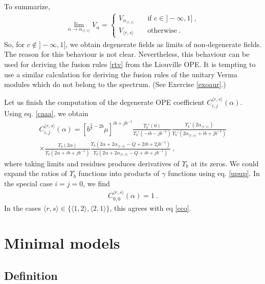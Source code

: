 \documentclass[12pt, a4paper, notitlepage, twoside]{report}
\numberwithin{equation}{section}
\theoremstyle{break}
\begin{document}
To summarize, 
\begin{align}
 \boxed{
 \underset{\alpha\to \alpha_{\langle r,s \rangle}}{\lim } V_\alpha = 
 \left\{ \begin{array}{ll}
          V_{\alpha_{\langle r,s \rangle}} \quad & \text{if\ } c\in ]-\infty, 1]\ ,
          \\
          V_{\langle r,s \rangle} & \text{otherwise}\ .
         \end{array}\right. 
         }
\label{vla}
\end{align}
So, for $c\notin ]-\infty, 1]$, we obtain degenerate fields as limits of non-degenerate fields. 
The reason for this behaviour is not clear.
Nevertheless, this behaviour can be used for deriving the fusion rules \eqref{rtv} from the Liouville OPE. 
It is tempting to use a similar calculation for deriving the fusion rules of the unitary Verma modules which do not belong to the spectrum. 
(See Exercise \ref{exoaur}.)

Let us finish the computation of the degenerate OPE coefficient $C_{i,j}^{\langle r,s \rangle}(\alpha)$.
Using eq. \eqref{caaa}, we obtain 
\begin{multline}
 C_{i,j}^{\langle r,s \rangle}(\alpha) = \left[b^{\frac{2}{b}-2b}\mu\right]^{ib+jb^{-1}} \frac{\Upsilon_b'(0)}{\Upsilon_b'(-ib-jb^{-1})} \frac{\Upsilon_b'(2\alpha_{\langle r,s \rangle})}{\Upsilon_b'(2\alpha_{\langle r,s \rangle}+ib+jb^{-1})}
\\ \times
 \frac{\Upsilon_b(2\alpha)}{\Upsilon_b(2\alpha+ib+jb^{-1})} \frac{\Upsilon_b(2\alpha+2\alpha_{\langle r,s \rangle}-Q+2ib+2jb^{-1})}{\Upsilon_b(2\alpha+2\alpha_{\langle r,s \rangle}-Q+ib+jb^{-1})} \ ,
\end{multline}
where taking limits and residues produces derivatives of $\Upsilon_b$ at its zeros.
We could expand the ratios of $\Upsilon_b$ functions into products of $\gamma$ functions using eq. \eqref{upup}.
In the special case $i=j=0$, we find
\begin{align}
 C_{0,0}^{\langle r,s \rangle}(\alpha) = 1 \ .
\end{align}
In the cases $\langle r,s \rangle \in \{\langle 1,2 \rangle, \langle 2,1 \rangle\}$, 
this agrees with eq \eqref{cco}.  



\section{Minimal models \label{secvmm}}

\subsection{Definition}
\end{document}
